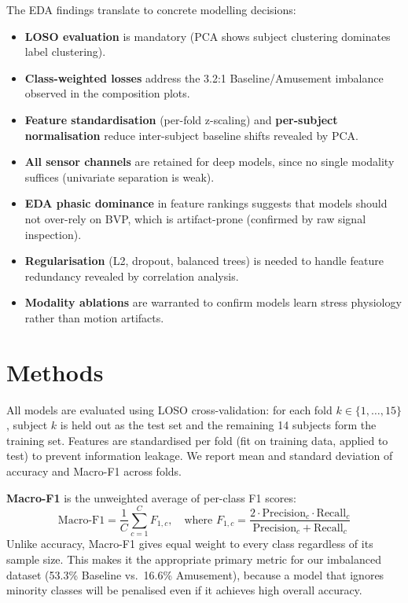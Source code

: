 \documentclass[11pt]{article}
\begin{document}
The EDA findings translate to concrete modelling decisions:
\begin{itemize}
  \item \textbf{LOSO evaluation} is mandatory (PCA shows subject clustering dominates label clustering).
  \item \textbf{Class-weighted losses} address the 3.2:1 Baseline/Amusement imbalance observed in the composition plots.
  \item \textbf{Feature standardisation} (per-fold z-scaling) and \textbf{per-subject normalisation} reduce inter-subject baseline shifts revealed by PCA.
  \item \textbf{All sensor channels} are retained for deep models, since no single modality suffices (univariate separation is weak).
  \item \textbf{EDA phasic dominance} in feature rankings suggests that models should not over-rely on BVP, which is artifact-prone (confirmed by raw signal inspection).
  \item \textbf{Regularisation} (L2, dropout, balanced trees) is needed to handle feature redundancy revealed by correlation analysis.
  \item \textbf{Modality ablations} are warranted to confirm models learn stress physiology rather than motion artifacts.
\end{itemize}


\section{Methods}
\label{sec:methods}

All models are evaluated using LOSO cross-validation: for each fold $k \in \{1, \ldots, 15\}$, subject $k$ is held out as the test set and the remaining 14 subjects form the training set.
Features are standardised per fold (fit on training data, applied to test) to prevent information leakage.
We report mean and standard deviation of accuracy and Macro-F1 across folds.

\textbf{Macro-F1} is the unweighted average of per-class F1 scores:
\begin{equation}
\text{Macro-F1} = \frac{1}{C} \sum_{c=1}^{C} F_{1,c}, \quad \text{where } F_{1,c} = \frac{2 \cdot \text{Precision}_c \cdot \text{Recall}_c}{\text{Precision}_c + \text{Recall}_c}
\end{equation}
Unlike accuracy, Macro-F1 gives equal weight to every class regardless of its sample size.
This makes it the appropriate primary metric for our imbalanced dataset (53.3\% Baseline vs.\ 16.6\% Amusement), because a model that ignores minority classes will be penalised even if it achieves high overall accuracy.
\end{document}
